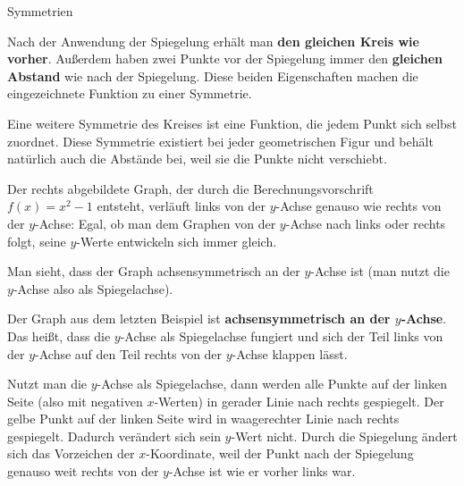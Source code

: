 \documentclass[../../main.tex]{subfiles}
\begin{document}
\begin{advanced}{Symmetrien}
\begin{example}{}
        Nach der Anwendung der Spiegelung erhält man \textbf{den gleichen Kreis wie vorher}. Außerdem haben zwei Punkte vor der Spiegelung immer den \textbf{gleichen Abstand} wie nach der Spiegelung. Diese beiden Eigenschaften machen die eingezeichnete Funktion zu einer Symmetrie.
        
        Eine weitere Symmetrie des Kreises ist eine Funktion, die jedem Punkt sich selbst zuordnet. Diese Symmetrie existiert bei jeder geometrischen Figur und behält natürlich auch die Abstände bei, weil sie die Punkte nicht verschiebt.
    \end{example}
\end{advanced}

\begin{example}{}
    Der rechts abgebildete Graph, der durch die Berechnungsvorschrift $f(x)=x^2-1$ entsteht, verläuft links von der $y$-Achse genauso wie rechts von der $y$-Achse: Egal, ob man dem Graphen von der $y$-Achse nach links oder rechts folgt, seine $y$-Werte entwickeln sich immer gleich.
    
    Man sieht, dass der Graph achsensymmetrisch an der $y$-Achse ist (man nutzt die $y$-Achse also als Spiegelachse).
\end{example}

Der Graph aus dem letzten Beispiel ist \textbf{achsensymmetrisch an der $y$-Achse}. Das heißt, dass die $y$-Achse als Spiegelachse fungiert und sich der Teil links von der $y$-Achse auf den Teil rechts von der $y$-Achse klappen lässt.


Nutzt man die $y$-Achse als Spiegelachse, dann werden alle Punkte auf der linken Seite (also mit negativen $x$-Werten) in gerader Linie nach rechts gespiegelt. Der gelbe Punkt auf der linken Seite wird in waagerechter Linie nach rechts gespiegelt. Dadurch verändert sich sein $y$-Wert nicht. Durch die Spiegelung ändert sich das Vorzeichen der $x$-Koordinate, weil der Punkt nach der Spiegelung genauso weit rechts von der $y$-Achse ist wie er vorher links war.
\end{document}
